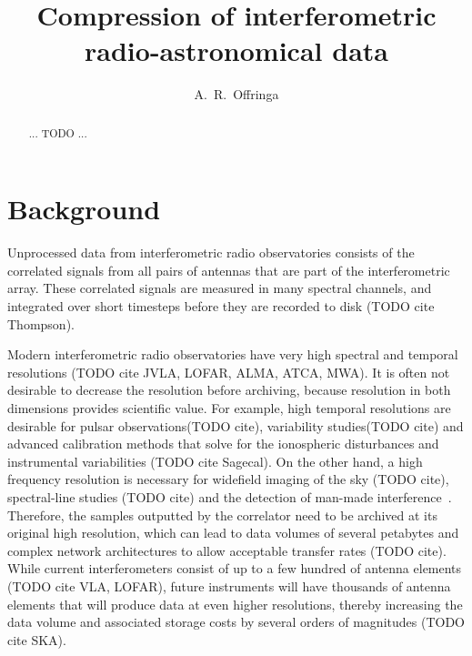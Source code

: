 \documentclass{article}
\title{Compression of interferometric radio-astronomical data}
\author[1,2]{A.~R.~Offringa}
\affil[1]{RSAA, Australian National University, Mt Stromlo Observatory, via Cotter Road, Weston, ACT 2611, Australia}
\affil[2]{ARC Centre of Excellence for All-Sky Astrophysics (CAASTRO)}
\begin{document}
\label{firstpage}
\maketitle

\begin{abstract}
... TODO ...
\end{abstract}

\section{Background}
Unprocessed data from interferometric radio observatories consists of the correlated signals from all pairs of antennas that are part of the interferometric array. These correlated signals are measured in many spectral channels, and integrated over short timesteps before they are recorded to disk (TODO cite Thompson).

Modern interferometric radio observatories have very high spectral and temporal resolutions (TODO cite JVLA, LOFAR, ALMA, ATCA, MWA). It is often not desirable to decrease the resolution before archiving, because resolution in both dimensions provides scientific value. For example, high temporal resolutions are desirable for pulsar observations(TODO cite), variability studies(TODO cite) and advanced calibration methods that solve for the ionospheric disturbances and instrumental variabilities (TODO cite Sagecal). On the other hand, a high frequency resolution is necessary for widefield imaging of the sky (TODO cite), spectral-line studies (TODO cite) and the detection of man-made interference~\cite{lofar-radio-environment}. Therefore, the samples outputted by the correlator need to be archived at its original high resolution, which can lead to data volumes of several petabytes and complex network architectures to allow acceptable transfer rates (TODO cite). While current interferometers consist of up to a few hundred of antenna elements (TODO cite VLA, LOFAR), future instruments will have thousands of antenna elements that will produce data at even higher resolutions, thereby increasing the data volume and associated storage costs by several orders of magnitudes (TODO cite SKA).
\end{document}
